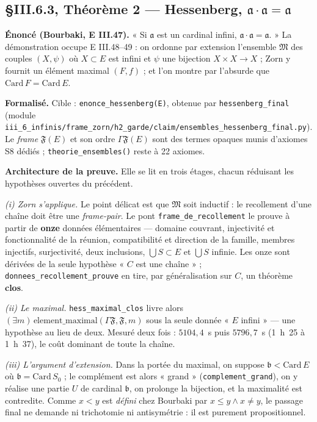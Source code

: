 \subsection{§III.6.3, Théorème 2 --- Hessenberg, $\mathfrak{a}\cdot\mathfrak{a}=\mathfrak{a}$}
\textbf{Énoncé (Bourbaki, E III.47).} « Si $\mathfrak{a}$ est un cardinal infini,
$\mathfrak{a}\cdot\mathfrak{a} = \mathfrak{a}$. » La démonstration occupe E III.48--49 :
on ordonne par extension l'ensemble $\mathfrak{M}$ des couples $(X,\psi)$ où $X\subset E$
est infini et $\psi$ une bijection $X\times X\to X$ ; Zorn y fournit un élément maximal
$(F,f)$ ; et l'on montre par l'absurde que $\mathrm{Card}\,F = \mathrm{Card}\,E$.

\textbf{Formalisé.} Cible : \texttt{enonce\_hessenberg(E)}, obtenue par
\texttt{hessenberg\_final} (module
\texttt{iii\_6\_infinis/frame\_zorn/h2\_garde/claim/ensembles\_hessenberg\_final.py}).
Le \emph{frame} $\mathfrak{F}(E)$ et son ordre $\Gamma\mathfrak{F}(E)$ sont des termes
opaques munis d'axiomes S8 dédiés ; \texttt{theorie\_ensembles()} reste à 22 axiomes.

\textbf{Architecture de la preuve.} Elle se lit en trois étages, chacun réduisant
les hypothèses ouvertes du précédent.

\emph{(i) Zorn s'applique.} Le point délicat est que $\mathfrak{M}$ soit inductif :
le recollement d'une chaîne doit être une \emph{frame-pair}. Le pont
\texttt{frame\_de\_recollement} le prouve à partir de \textbf{onze} données
élémentaires --- domaine couvrant, injectivité et fonctionnalité de la réunion,
compatibilité et direction de la famille, membres injectifs, surjectivité, deux
inclusions, $\bigcup S \subset E$ et $\bigcup S$ infinie. Les onze sont dérivées de
la seule hypothèse « $C$ est une chaîne » ; \texttt{donnees\_recollement\_prouve} en
tire, par généralisation sur $C$, un théorème \textbf{clos}.

\emph{(ii) Le maximal.} \texttt{hess\_maximal\_clos} livre alors
$(\exists m)\,\mathrm{element\_maximal}(\Gamma\mathfrak{F},\mathfrak{F},m)$ sous la
seule donnée « $E$ infini » --- une hypothèse au lieu de deux. Mesuré deux fois :
$5104{,}4$~s puis $5796{,}7$~s (1~h~25 à 1~h~37), le coût dominant de toute la
chaîne.

\emph{(iii) L'argument d'extension.} Dans la portée du maximal, on suppose
$\mathfrak{b} < \mathrm{Card}\,E$ où $\mathfrak{b} = \mathrm{Card}\,S_0$ ; le
complément est alors « grand » (\texttt{complement\_grand}), on y réalise une partie
$U$ de cardinal $\mathfrak{b}$, on prolonge la bijection, et la maximalité est
contredite. Comme $x < y$ est \emph{défini} chez Bourbaki par $x \le y \wedge x \ne y$,
le passage final ne demande ni trichotomie ni antisymétrie : il est purement
propositionnel.

